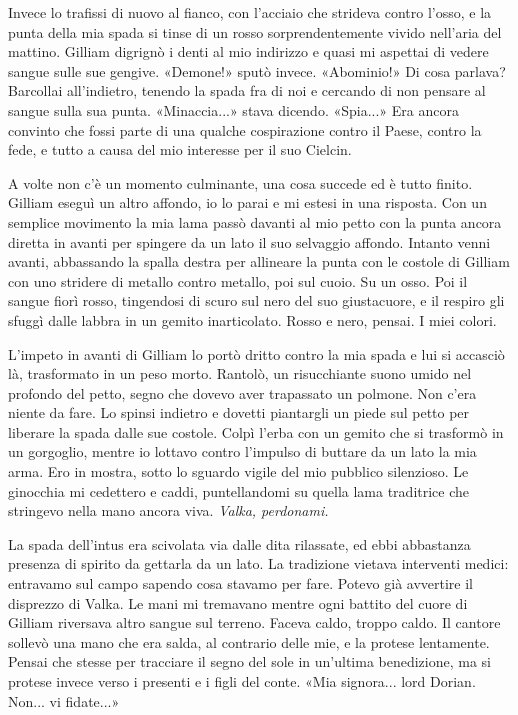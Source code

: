 Invece lo trafissi di nuovo al fianco, con l'acciaio che strideva contro
l'osso, e la punta della mia spada si tinse di un rosso
sorprendentemente vivido nell'aria del mattino. Gilliam digrignò i denti
al mio indirizzo e quasi mi aspettai di vedere sangue sulle sue gengive.
«Demone!» sputò invece. «Abominio!» Di cosa parlava? Barcollai
all'indietro, tenendo la spada fra di noi e cercando di non pensare al
sangue sulla sua punta. «Minaccia...» stava dicendo. «Spia...» Era
ancora convinto che fossi parte di una qualche cospirazione contro il
Paese, contro la fede, e tutto a causa del mio interesse per il suo
Cielcin.

A volte non c'è un momento culminante, una cosa succede ed è tutto
finito. Gilliam eseguì un altro affondo, io lo parai e mi estesi in una
risposta. Con un semplice movimento la mia lama passò davanti al mio
petto con la punta ancora diretta in avanti per spingere da un lato il
suo selvaggio affondo. Intanto venni avanti, abbassando la spalla destra
per allineare la punta con le costole di Gilliam con uno stridere di
metallo contro metallo, poi sul cuoio. Su un osso. Poi il sangue fiorì
rosso, tingendosi di scuro sul nero del suo giustacuore, e il respiro
gli sfuggì dalle labbra in un gemito inarticolato. Rosso e nero, pensai.
I miei colori.

L'impeto in avanti di Gilliam lo portò dritto contro la mia spada e lui
si accasciò là, trasformato in un peso morto. Rantolò, un risucchiante
suono umido nel profondo del petto, segno che dovevo aver trapassato un
polmone. Non c'era niente da fare. Lo spinsi indietro e dovetti
piantargli un piede sul petto per liberare la spada dalle sue costole.
Colpì l'erba con un gemito che si trasformò in un gorgoglio, mentre io
lottavo contro l'impulso di buttare da un lato la mia arma. Ero in
mostra, sotto lo sguardo vigile del mio pubblico silenzioso. Le
ginocchia mi cedettero e caddi, puntellandomi su quella lama traditrice
che stringevo nella mano ancora viva. \emph{Valka, perdonami.}

La spada dell'intus era scivolata via dalle dita rilassate, ed ebbi
abbastanza presenza di spirito da gettarla da un lato. La tradizione
vietava interventi medici: entravamo sul campo sapendo cosa {stavamo}
per fare. Potevo già avvertire il disprezzo di Valka. Le mani mi
tremavano mentre ogni battito del cuore di Gilliam riversava altro
sangue sul terreno. Faceva caldo, troppo caldo. Il cantore sollevò una
mano che era salda, al contrario delle mie, e la protese lentamente.
Pensai che stesse per tracciare il segno del sole in un'ultima
benedizione, ma si protese invece verso i presenti e i figli del conte.
«Mia signora... lord Dorian. Non... vi fidate...»

